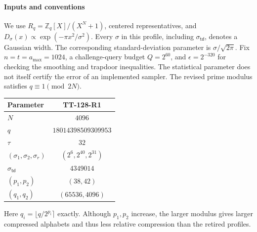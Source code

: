 \documentclass[lettersize,journal]{IEEEtran}
\begin{document}
\paragraph{Inputs and conventions}
We use $R_q=\mathbb Z_q[X]/(X^N+1)$, centered representatives, and
$D_\sigma(x)\propto\exp(-\pi x^2/\sigma^2)$.
Every $\sigma$ in this profile, including
$\sigma_{\mathsf{td}}$, denotes a Gaussian width. The corresponding
standard-deviation parameter is $\sigma/\sqrt{2\pi}$.
Fix
$n=t=a_{\max}=1024$, a challenge-query budget $Q=2^{60}$, and
$\epsilon=2^{-320}$ for checking the smoothing and trapdoor inequalities.
The statistical parameter does not itself certify the error of an
implemented sampler. The revised prime modulus satisfies
$q\equiv1\pmod{2N}$.
\begin{center}
\small
\begin{tabular}{lc}
\hline
Parameter & TT-128-R1\\
\hline
$N$ & $4096$\\
$q$ & $18014398509309953$\\
$\tau$ & $32$\\
$(\sigma_1,\sigma_2,\sigma_r)$ & $(2^6,2^{40},2^{31})$\\
$\sigma_{\mathsf{td}}$ & $4349014$\\
$(p_1,p_2)$ & $(38,42)$\\
$(q_1,q_2)$ & $(65536,4096)$\\
\hline
\end{tabular}
\end{center}
Here $q_i=\lfloor q/2^{p_i}\rceil$ exactly. Although $p_1,p_2$ increase,
the larger modulus gives larger compressed alphabets and thus less
relative compression than the retired profiles.
\end{document}
